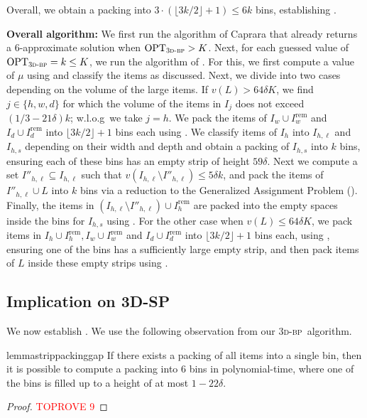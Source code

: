 \documentclass[a4paper,UKenglish,cleveref, autoref, thm-restate]{lipics-v2021}
\newcommand{\opt}{\mathrm{OPT}}
\newcommand{\tbp}{\textsc{3d-bp}\xspace}
\begin{document}
\noindent Overall, we obtain a packing into $3\cdot (\lfloor 3k/2 \rfloor +1) \le 6k$ bins, establishing .

\textbf{Overall algorithm:} We first run the algorithm of Caprara \cite{caprara2008packing} that already returns a 6-approximate solution when $\opt_{\tbp} > K$. Next, for each guessed value of $\opt_{\tbp}=k \le K$, we run the algorithm of . For this, we first compute a value of $\mu$ using  and classify the items as discussed.
Next, we divide into two cases depending on the volume of the large items. If $v(L) > 64\delta K$, we find $j \in \{h,w,d\}$ for which the volume of the items in $I_j$ does not exceed $(1/3-21\delta)k$; w.l.o.g~we take $j=h$. We pack the items of $I_w \cup I^{\text{rem}}_w$ and $I_d \cup I^{\text{rem}}_d$ into $\lfloor 3k/2\rfloor +1$ bins each using . We classify items of $I_h$ into $I_{h,\ell}$ and $I_{h,s}$ depending on their width and depth and obtain a packing of $I_{h,s}$ into $k$ bins, ensuring each of these bins has an empty strip of height $59\delta$. Next we compute a set $I''_{h,\ell}\subseteq I_{h,\ell}$ such that $v(I_{h,\ell}\setminus I''_{h,\ell}) \le 5\delta k$, and pack the items of $I''_{h,\ell}\cup L$ into $k$ bins via a reduction to the Generalized Assignment Problem (). Finally, the items in $(I_{h,\ell}\setminus I''_{h,\ell})\cup I^{\text{rem}}_h$ are packed into the empty spaces inside the bins for $I_{h,s}$ using . For the other case when $v(L)\le 64\delta K$, we pack items in $I_h\cup I^{\text{rem}}_h, I_w \cup I^{\text{rem}}_w$ and $I_d \cup I^{\text{rem}}_d$ into $\lfloor 3k/2 \rfloor + 1$ bins each, using , ensuring one of the bins has a sufficiently large empty strip, and then pack items of $L$ inside these empty strips using .  









\subsection{Implication on 3D-SP}
We now establish . We use the following observation from our \tbp~algorithm.


\begin{restatable}{lemma}{strippackinggap}
\label{lem:strippackinggap}
    If there exists a packing of all items into a single bin, then it is possible to compute a packing into 6 bins in polynomial-time, where one of the bins is filled up to a height of at most $1-22\delta$.
\end{restatable}
\begin{proof}\textcolor{red}{TOPROVE 9}\end{proof}
\end{document}
